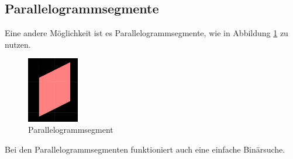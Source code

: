 \subsection{Parallelogrammsegmente}
Eine andere Möglichkeit ist es Parallelogrammsegmente, wie in Abbildung \ref{fig:parallelogramm} zu nutzen.
\begin{figure}[ht]
	\centering
	\includegraphics[width=0.2\textwidth]{fig/parallelogramm.png}
	\caption{Parallelogrammsegment}
	\label{fig:parallelogramm}
\end{figure}
\FloatBarrier
Bei den Parallelogrammsegmenten funktioniert auch eine einfache Binärsuche.



